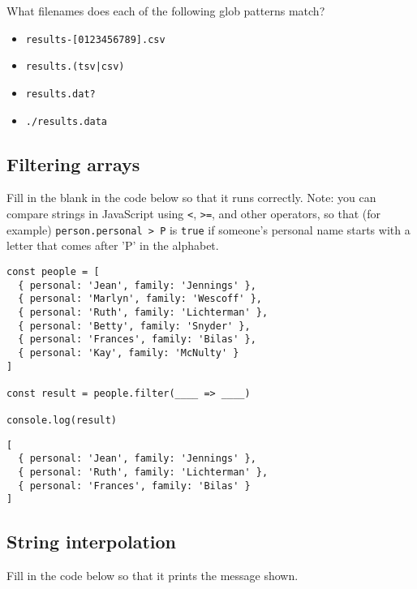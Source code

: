 \documentclass[krantzl]{krantz}
\begin{document}
What filenames does each of the following glob patterns match?

\begin{itemize}

\item \texttt{results-[0123456789].csv}

\item \texttt{results.(tsv|csv)}

\item \texttt{results.dat?}

\item \texttt{./results.data}

\end{itemize}

\subsection*{Filtering arrays}


Fill in the blank in the code below so that it runs correctly.
Note: you can compare strings in JavaScript using \texttt{<}, \texttt{>=}, and other operators,
so that (for example) \texttt{person.personal > {\textquotesingle}P{\textquotesingle}} is \texttt{true}
if someone's personal name starts with a letter that comes after 'P' in the alphabet.


\begin{lstlisting}[frame=single,frameround=tttt]
const people = [
  { personal: 'Jean', family: 'Jennings' },
  { personal: 'Marlyn', family: 'Wescoff' },
  { personal: 'Ruth', family: 'Lichterman' },
  { personal: 'Betty', family: 'Snyder' },
  { personal: 'Frances', family: 'Bilas' },
  { personal: 'Kay', family: 'McNulty' }
]

const result = people.filter(____ => ____)

console.log(result)
\end{lstlisting}



\begin{lstlisting}[frame=single,frameround=tttt]
[
  { personal: 'Jean', family: 'Jennings' },
  { personal: 'Ruth', family: 'Lichterman' },
  { personal: 'Frances', family: 'Bilas' }
]
\end{lstlisting}


\subsection*{String interpolation}


Fill in the code below so that it prints the message shown.
\end{document}
